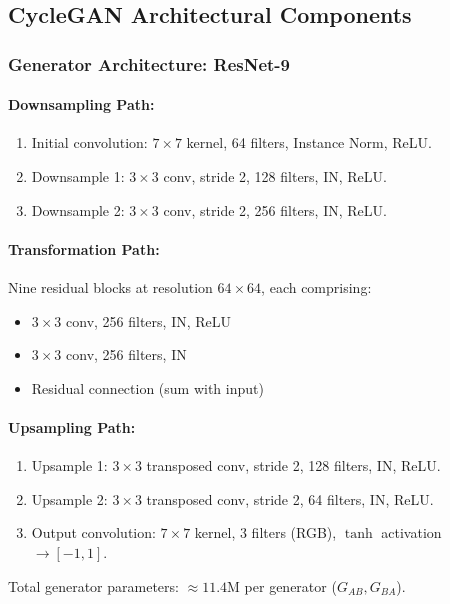 \documentclass[conference]{IEEEtran}
\begin{document}
\subsection{CycleGAN Architectural Components}
\subsubsection{Generator Architecture: ResNet-9}
\paragraph{Downsampling Path:}
\begin{enumerate}
\item Initial convolution: $7 \times 7$ kernel, 64 filters, Instance Norm, ReLU.
\item Downsample 1: $3 \times 3$ conv, stride 2, 128 filters, IN, ReLU.
\item Downsample 2: $3 \times 3$ conv, stride 2, 256 filters, IN, ReLU.
\end{enumerate}

\paragraph{Transformation Path:}
Nine residual blocks at resolution $64 \times 64$, each comprising:
\begin{itemize}
\item $3 \times 3$ conv, 256 filters, IN, ReLU
\item $3 \times 3$ conv, 256 filters, IN
\item Residual connection (sum with input)
\end{itemize}

\paragraph{Upsampling Path:}
\begin{enumerate}
\item Upsample 1: $3 \times 3$ transposed conv, stride 2, 128 filters, IN, ReLU.
\item Upsample 2: $3 \times 3$ transposed conv, stride 2, 64 filters, IN, ReLU.
\item Output convolution: $7 \times 7$ kernel, 3 filters (RGB), $\tanh$ activation $\to [-1,1]$.
\end{enumerate}

Total generator parameters: $\approx 11.4$M per generator ($G_{AB}, G_{BA}$).
\end{document}

